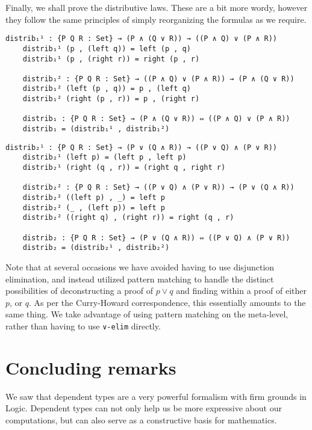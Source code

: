 \documentclass[12pt]{article}
\begin{document}
Finally, we shall prove the distributive laws. These are a bit more wordy, however they follow the same principles of simply reorganizing the formulas as we require.
\begin{Verbatim}[samepage=true]
    distrib₁¹ : {P Q R : Set} → (P ∧ (Q ∨ R)) → ((P ∧ Q) ∨ (P ∧ R))
    distrib₁¹ (p , (left q)) = left (p , q)
    distrib₁¹ (p , (right r)) = right (p , r)

    distrib₁² : {P Q R : Set} → ((P ∧ Q) ∨ (P ∧ R)) → (P ∧ (Q ∨ R))
    distrib₁² (left (p , q)) = p , (left q)
    distrib₁² (right (p , r)) = p , (right r)

    distrib₁ : {P Q R : Set} → (P ∧ (Q ∨ R)) ⇔ ((P ∧ Q) ∨ (P ∧ R))
    distrib₁ = (distrib₁¹ , distrib₁²)
\end{Verbatim}
\begin{Verbatim}[samepage=true]
    distrib₂¹ : {P Q R : Set} → (P ∨ (Q ∧ R)) → ((P ∨ Q) ∧ (P ∨ R))
    distrib₂¹ (left p) = (left p , left p)
    distrib₂¹ (right (q , r)) = (right q , right r)

    distrib₂² : {P Q R : Set} → ((P ∨ Q) ∧ (P ∨ R)) → (P ∨ (Q ∧ R))
    distrib₂² ((left p) , _) = left p
    distrib₂² (_ , (left p)) = left p
    distrib₂² ((right q) , (right r)) = right (q , r)

    distrib₂ : {P Q R : Set} → (P ∨ (Q ∧ R)) ⇔ ((P ∨ Q) ∧ (P ∨ R))
    distrib₂ = (distrib₂¹ , distrib₂²)
\end{Verbatim}
Note that at several occasions we have avoided having to use disjunction elimination, and instead utilized pattern matching to handle the distinct possibilities of deconstructing a proof of $p ∨ q$ and finding within a proof of either $p$, or $q$. As per the Curry-Howard correspondence, this essentially amounts to the same thing. We take advantage of using pattern matching on the meta-level, rather than having to use \verb|∨-elim| directly.

\section{Concluding remarks}
We saw that dependent types are a very powerful formalism with firm grounds in Logic. Dependent types can not only help us be more expressive about our computations, but can also serve as a constructive basis for mathematics.

\newpage
\printbibliography{}
\end{document}
